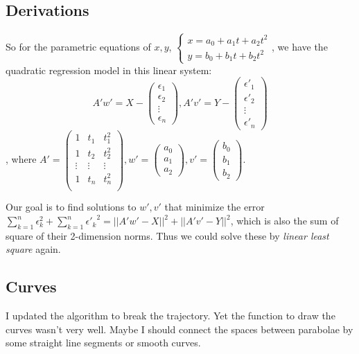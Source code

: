 \documentclass[12pt, a4paper]{article}
\begin{document}
\subsection{Derivations}

So for the parametric equations of $x,y$, $\left\{\begin{array}{c}x=a_0+a_1t+a_2t^2\\y=b_0+b_1t+b_2t^2\end{array}\right.$, we have the quadratic regression model in this linear system:
$$
A'w'=X-\begin{pmatrix} \epsilon_1 \\ \epsilon_2 \\ \vdots \\ \epsilon_n \end{pmatrix},
A'v'=Y-\begin{pmatrix} \epsilon'_1 \\ \epsilon'_2 \\ \vdots \\ \epsilon'_n \end{pmatrix}
$$, where $A'=\begin{pmatrix} 1 & t_1 & t_1^2 \\ 1 & t_2 & t_2^2 \\ \vdots & \vdots & \vdots \\ 1 & t_n & t_n^2 \\ \end{pmatrix},w'=\begin{pmatrix} a_0 \\ a_1 \\ a_2 \end{pmatrix},v'=\begin{pmatrix} b_0 \\ b_1 \\ b_2 \end{pmatrix}$.

Our goal is to find solutions to $w',v'$ that minimize the error $\sum_{k=1}^n\epsilon_k^2+\sum_{k=1}^n{\epsilon'_k}^2=||A'w'-X||^2+||A'v'-Y||^2$, which is also the sum of square of their 2-dimension norms. Thus we could solve these by \emph{linear least square} again.

\subsection{Curves}

I updated the algorithm to break the trajectory. Yet the function to draw the curves wasn't very well. Maybe I should connect the spaces between parabolae by some straight line segments or smooth curves.
\end{document}
